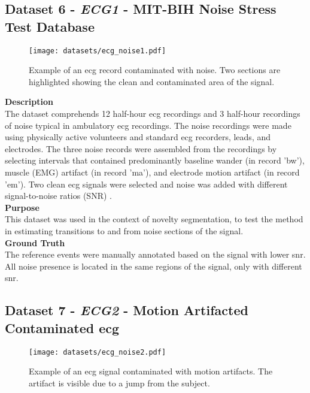 \subsection{Dataset 6 - \textit{ECG1} - MIT-BIH Noise Stress Test Database}
\label{dat:dataset7}

\begin{figure}
\centering
\texttt{[image: datasets/ecg\_noise1.pdf]}
\caption{Example of an \gls{ecg} record contaminated with noise. Two sections are highlighted showing the clean and contaminated area of the signal. \cite{dataset7}}
\label{fig:ecg1_dataset}
\end{figure}

\textbf{Description}\hfill\\
The dataset comprehends 12 half-hour \gls{ecg} recordings and 3 half-hour recordings of noise typical in ambulatory \gls{ecg} recordings. The noise recordings were made using physically active volunteers and standard \gls{ecg} recorders, leads, and electrodes. The three noise records were assembled from the recordings by selecting intervals that contained predominantly baseline wander (in record 'bw'), muscle (EMG) artifact (in record 'ma'), and electrode motion artifact (in record 'em'). Two clean \gls{ecg} signals were selected and noise was added with different signal-to-noise ratios (SNR) \cite{dataset6, PhysioNet}.\\
\textbf{Purpose}\hfill\\
This dataset was used in the context of novelty segmentation, to test the method in estimating transitions to and from noise sections of the signal.\\
\textbf{Ground Truth}\\
The reference events were manually annotated based on the signal with lower \gls{snr}. All noise presence is located in the same regions of the signal, only with different \gls{snr}.

    
\subsection{Dataset 7 - \textit{ECG2} - Motion Artifacted Contaminated \gls{ecg}}
\label{dat:dataset8}
\begin{figure}
\centering
\texttt{[image: datasets/ecg\_noise2.pdf]}
\caption{Example of an \gls{ecg} signal contaminated with motion artifacts. The artifact is visible due to a jump from the subject.}
\label{fig:ecg2_dataset}
\end{figure}

